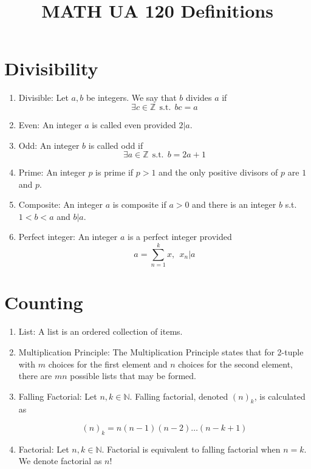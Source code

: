 \documentclass{article}
\title{MATH UA 120 Definitions}
\date{}
\begin{document}
	\maketitle
	
	\section*{Divisibility}
	
	\begin{enumerate}
		\item Divisible: Let $a,b$ be integers.
		We say that $b$ divides $a$ if
		\[\exists c\in\mathbb{Z}\:\: \text{s.t.} \:\: bc=a\]
		
		\item Even: An integer $a$ is called even provided $2|a$.
		
		\item Odd: An integer $b$ is called odd if
		\[\exists a\in\mathbb{Z} \:\: \text{s.t.} \:\: b=2a+1\]
		
		\item Prime: An integer $p$ is prime if $p>1$ and the only positive divisors of $p$ are $1$ and $p$.
		
		\item Composite: An integer $a$ is composite if $a>0$ and there is an integer $b$ s.t. $1<b<a$ and $b|a$.
		
		\item Perfect integer: An integer $a$ is a perfect integer provided
		\[a=\sum_{n=1}^k x,\:\: x_n|a\]
	\end{enumerate}
	
	\section*{Counting}
	
	\begin{enumerate}
		\item List: A list is an ordered collection of items.
		
		\item Multiplication Principle: The Multiplication Principle states that for 2-tuple with $m$ choices for the first element and $n$ choices for the second element, there are $mn$ possible lists that may be formed.
		
		\item Falling Factorial: Let $n,k\in\mathbb{N}$.
		Falling factorial, denoted $(n)_k$, is calculated as
		
		\[(n)_k=n(n-1)(n-2)\dots(n-k+1)\]
		
		\item Factorial: Let $n,k\in\mathbb{N}$.
		Factorial is equivalent to falling factorial when $n=k$.
		We denote factorial as $n!$
	
	\end{enumerate}
	
\end{document}
